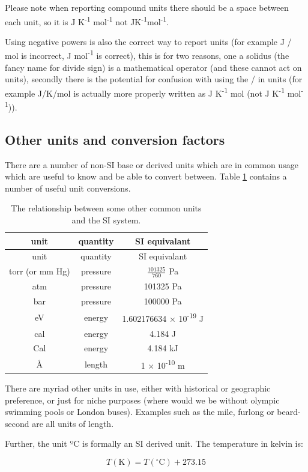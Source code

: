\documentclass[
]{book}
\begin{document}
Please note when reporting compound units there should be a space between each unit, so it is J K\textsuperscript{-1} mol\textsuperscript{-1} not JK\textsuperscript{-1}mol\textsuperscript{-1}.

Using negative powers is also the correct way to report units (for example J / mol is incorrect, J mol\textsuperscript{-1} is correct), this is for two reasons, one a solidus (the fancy name for divide sign) is a mathematical operator (and these cannot act on units), secondly there is the potential for confusion with using the / in units (for example J/K/mol is actually more properly written as J K\textsuperscript{-1} mol (not J K\textsuperscript{-1} mol\textsuperscript{-1})).

\hypertarget{other-units-and-conversion-factors}{%
\subsection{Other units and conversion factors}\label{other-units-and-conversion-factors}}

There are a number of non-SI base or derived units which are in common usage which are useful to know and be able to convert between. Table \ref{tab:nonSI} contains a number of useful unit conversions.

\begin{longtable}[]{@{}ccc@{}}
\caption{\label{tab:nonSI} The relationship between some other common units and the SI system.}\tabularnewline
\toprule
unit & quantity & SI equivalant\tabularnewline
\midrule
\endfirsthead
\toprule
unit & quantity & SI equivalant\tabularnewline
\midrule
\endhead
torr (or mm Hg) & pressure & \(\frac{101325}{760}\) Pa\tabularnewline
atm & pressure & 101325 Pa\tabularnewline
bar & pressure & 100000 Pa\tabularnewline
eV & energy & 1.602176634 × 10\textsuperscript{-19} J\tabularnewline
cal & energy & 4.184 J\tabularnewline
Cal & energy & 4.184 kJ\tabularnewline
Å & length & 1 × 10\textsuperscript{-10} m\tabularnewline
\bottomrule
\end{longtable}

There are myriad other units in use, either with historical or geographic preference, or just for niche purposes (where would we be without olympic swimming pools or London buses). Examples such as the mile, furlong or beard-second are all units of length.

Further, the unit ºC is formally an SI derived unit. The temperature in kelvin is:

{
\begin{equation*}
T (\textrm{K}) = T (^\circ \textrm{C}) + 273.15
\end{equation*}
}
\end{document}
